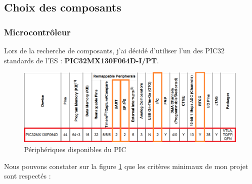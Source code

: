 \subsection{Choix des composants} \label{ssec:num32}
{
	\subsubsection{Microcontrôleur}
	Lors de la recherche de composants, j'ai décidé d'utiliser l'un des PIC32 standards de l'ES :
	\textbf{PIC32MX130F064D-I/PT}.
		
	\begin{figure}[h]
		\centering
		\includegraphics[width=1\linewidth]{Figures/Dev-SCH/PIC32-choisi}
		\caption{Périphériques disponibles du PIC}
		\label{fig:pic32-choisi}
	\end{figure}
	
	Nous pouvons constater sur la figure \ref{fig:pic32-choisi} que les critères minimaux de mon projet sont respectés :
	
	\begin{center}
		   
	\end{center}
}

\clearpage
